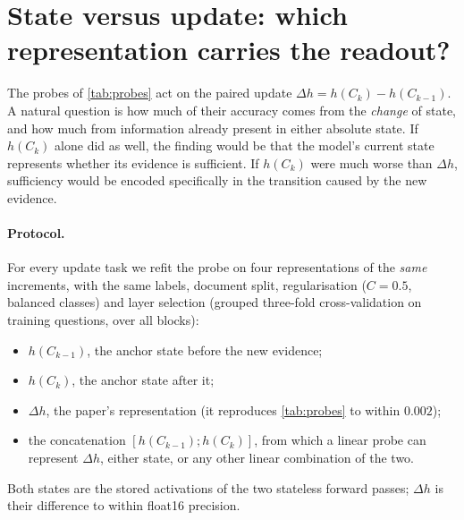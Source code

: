 \section{State versus update: which representation carries the readout?}
\label{app:rep}

The probes of \cref{tab:probes} act on the paired update $\Delta h=h(C_k)-h(C_{k-1})$. A natural question is how much of their accuracy comes from the \emph{change} of state, and how much from information already present in either absolute state. If $h(C_k)$ alone did as well, the finding would be that the model's current state represents whether its evidence is sufficient. If $h(C_k)$ were much worse than $\Delta h$, sufficiency would be encoded specifically in the transition caused by the new evidence.

\paragraph{Protocol.} For every update task we refit the probe on four representations of the \emph{same} increments, with the same labels, document split, regularisation ($C=0.5$, balanced classes) and layer selection (grouped three-fold cross-validation on training questions, over all blocks):
\begin{itemize}
  \item $h(C_{k-1})$, the anchor state before the new evidence;
  \item $h(C_k)$, the anchor state after it;
  \item $\Delta h$, the paper's representation (it reproduces \cref{tab:probes} to within $0.002$);
  \item the concatenation $[h(C_{k-1});h(C_k)]$, from which a linear probe can represent $\Delta h$, either state, or any other linear combination of the two.
\end{itemize}
Both states are the stored activations of the two stateless forward passes; $\Delta h$ is their difference to within float16 precision.

\begin{table}[t]
\centering\small

\caption{Held-out AUROC (document split, best layer by inner cross-validation) of probes for each update task, fitted on four representations of the same increments. Bold: best per row.}
\label{tab:rep_ablation}
\end{table}

